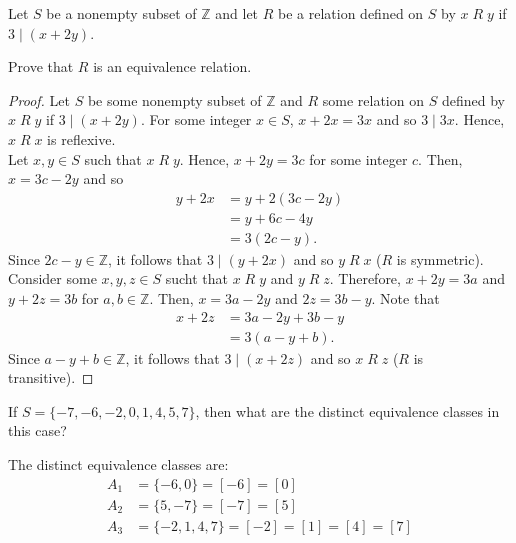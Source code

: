 \documentclass[12pt]{article}
\newcommand{\Z}{\mathbb{Z}}
\newenvironment{problem}[2][Problem]{\begin{trivlist}
		\item[\hskip \labelsep {\bfseries #1}\hskip \labelsep {\bfseries #2.}]}{\end{trivlist}}
\newenvironment{solution}[2][Solution]{\begin{trivlist}
		\item[\hskip \labelsep {\bfseries #1}\hskip \labelsep {\bfseries #2.}]}{\end{trivlist}}
\begin{document}
 	\begin{problem}{39}
 		Let $S$ be a nonempty subset of $\Z$ and let $R$ be a relation defined on $S$ by $x\; R \; y$ if $3\mid (x+2y)$.
 		\begin{enumerate}[label=(\alph*)]
 			\item Prove that $R$ is an equivalence relation.
 			\begin{proof}
 				Let $S$ be some nonempty subset of $\Z$ and $R$ some relation on $S$ defined by $x\; R \; y$ if $3\mid (x+2y)$. For some integer $x\in S$, $x+2x = 3x$ and so $3\mid 3x$. Hence, $x\; R \; x$ is reflexive.\\
 				Let $x,y\in S$ such that $x\; R \; y$. Hence, $x+2y = 3c$ for some integer $c$. Then, $x = 3c-2y$ and so
 			\begin{align*}
 				 y+2x &= y+2(3c-2y) \\
 				 &= y+6c-4y \\
 				 &= 3(2c-y).
 			 \end{align*}
 		 Since $2c-y\in \Z$, it follows that $3\mid (y+2x)$ and so $y\; R \; x$ ($R$ is symmetric). \\
 		 Consider some $x,y,z\in S$ sucht that $x\; R \; y$ and $y\; R \; z$. Therefore, $x+2y = 3a$ and $y+2z= 3b$ for $a,b\in \Z$. Then, $x= 3a-2y$ and $2z=3b-y$. Note that
 		 \begin{align*}
 		 	x+2z &= 3a-2y+3b-y\\
 		 	&= 3(a-y+b).
 		 \end{align*}
 	 Since $a-y+b\in \Z$, it follows that $3\mid (x+2z)$ and so $x\; R \; z$ ($R$ is transitive).
 			\end{proof}
 			\item If $S=\{-7,-6,-2,0,1,4,5,7\}$, then what are the distinct equivalence classes in this case?
 			\begin{solution}{(b)}
 				The distinct equivalence classes are:
 				\begin{align*}
 					A_{1} &= \{-6,0\} = [-6] = [0]\\
 					A_{2} &= \{5,-7\} = [-7] = [5]\\
 				A_{3} &= \{-2,1,4,7\} = [-2] = [1] = [4] = [7]\\
 				\end{align*}
 			\end{solution}
 		\end{enumerate}
 	\end{problem}
 
\end{document}
